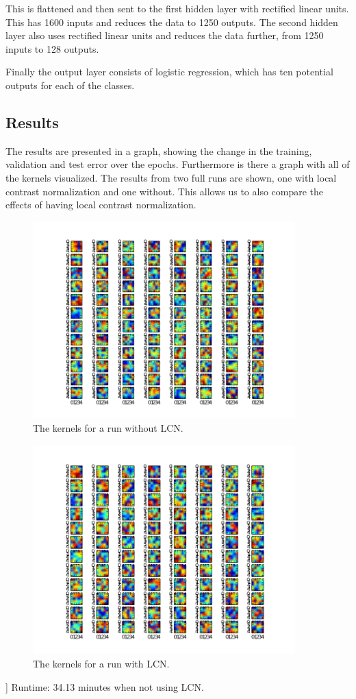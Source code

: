 This is flattened and then sent to the first hidden layer with rectified linear units. This has 1600 inputs and reduces the data to 1250 outputs. The second hidden layer also uses rectified linear units and reduces the data further, from 1250 inputs to 128 outputs. 

Finally the output layer consists of logistic regression, which has ten potential outputs for each of the classes.

\subsection*{Results}
The results are presented in a graph, showing the change in the training, validation and test error over the epochs. Furthermore is there a graph with all of the kernels visualized. The results from two full runs are shown, one with local contrast normalization and one without. This allows us to also compare the effects of having local contrast normalization.

\begin{figure}[ht!]
	\centering
	\includegraphics[width=0.9\textwidth]{./img/Exercise3/Run1/3264end.png}	
	\caption{The kernels for a run without LCN.}
	\label{fig:3:kernelsNoLCN}
\end{figure}

\begin{figure}[ht!]
	\centering
	\includegraphics[width=0.9\textwidth]{./img/Exercise3/Run2LCN/ass3final.png}	
	\caption{The kernels for a run with LCN.}
	\label{fig:3:kernelsLCN}
\end{figure}


]
Runtime: 34.13 minutes when not using LCN.
